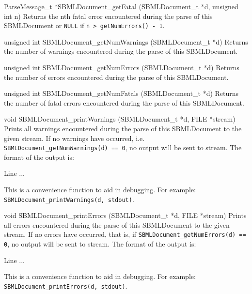 \documentclass{cekmanual}
\begin{document}
\begin{methoddef}{ParseMessage\_t *SBMLDocument\_getFatal (SBMLDocument\_t *d,
unsigned int n)}
   Returns the nth fatal error encountered during the parse of this
   SBMLDocument or \texttt{NULL} if \texttt{n > getNumErrors() - 1}.
 \end{methoddef}


\begin{methoddef}{unsigned int SBMLDocument\_getNumWarnings
(SBMLDocument\_t *d)}
   Returns the number of warnings encountered during the parse of this
   SBMLDocument.
 \end{methoddef}

\begin{methoddef}{unsigned int SBMLDocument\_getNumErrors (SBMLDocument\_t *d)}
   Returns the number of errors encountered during the parse of this
   SBMLDocument.
 \end{methoddef}

\begin{methoddef}{unsigned int SBMLDocument\_getNumFatals (SBMLDocument\_t *d)}
   Returns the number of fatal errors encountered during the parse of this
   SBMLDocument.
 \end{methoddef}
  

\begin{methoddef}{void SBMLDocument\_printWarnings (SBMLDocument\_t *d,
FILE *stream)}
  Prints all warnings encountered during the parse of this SBMLDocument to
  the given stream.  If no warnings have occurred, i.e.
  \texttt{SBMLDocument\_getNumWarnings(d) == 0}, no output will be sent to
  stream. The format of the output is:
  \begin{example}
      Line %
      ...
  \end{example}
  This is a convenience function to aid in debugging.  For example:\\
  \texttt{SBMLDocument\_printWarnings(d, stdout)}.
 \end{methoddef}
  

\begin{methoddef}{void SBMLDocument\_printErrors (SBMLDocument\_t *d,
FILE *stream)}
  Prints all errors encountered during the parse of this SBMLDocument
  to the given stream.  If no errors have occurred, that is, if 
  \texttt{SBMLDocument\_getNumErrors(d) == 0}, no output will be sent
  to stream. The format of the output is:
  \begin{example}
      Line %
      ...
  \end{example}
  This is a convenience function to aid in debugging.  For example:\\
  \texttt{SBMLDocument\_printErrors(d, stdout)}.
 \end{methoddef}
  
\end{document}
